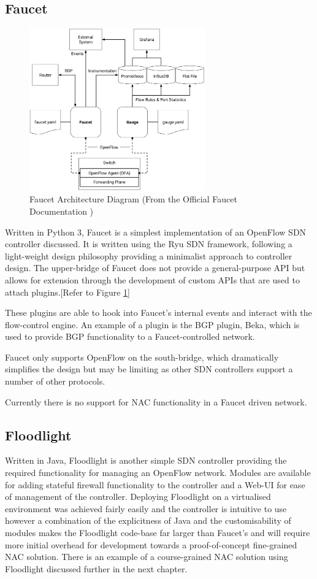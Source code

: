 \subsection{Faucet}
\begin{figure}\begin{center}
    \includegraphics[height=7cm]{images/faucet_architecture.png}
    \caption{Faucet Architecture Diagram (From the Official Faucet Documentation \cite{faucet_architecture_diagram})}
    \label{fig:faucet_architecture}
\end{center}\end{figure}
Written in Python 3, Faucet is a simplest implementation of an OpenFlow SDN controller discussed. It is written using the Ryu SDN framework, following a light-weight design philosophy providing a minimalist approach to controller design.
The upper-bridge of Faucet does not provide a general-purpose API but allows for extension through the development of custom APIs that are used to attach plugins.[Refer to Figure \ref{fig:faucet_architecture}]

These plugins are able to hook into Faucet's internal events and interact with the flow-control engine. An example of a plugin is the BGP plugin, Beka\cite{beka_github}, which is used to provide BGP functionality to a Faucet-controlled network.

Faucet only supports OpenFlow on the south-bridge, which dramatically simplifies the design but may be limiting as other SDN controllers support a number of other protocols.

Currently there is no support for NAC functionality in a Faucet driven network.

\subsection{Floodlight}
Written in Java, Floodlight is another simple SDN controller providing the required functionality for managing an OpenFlow network. 
Modules are available for adding stateful firewall functionality to the controller and a Web-UI for ease of management of the controller.
Deploying Floodlight on a virtualised environment was achieved fairly easily and the controller is intuitive to use however a combination of the explicitness of Java and the customisability of modules makes the Floodlight code-base far larger than Faucet's and will require more initial overhead for development towards a proof-of-concept fine-grained NAC solution.
There is an example of a course-grained NAC solution using Floodlight\cite{vainius_sdn_nac} discussed further in the next chapter.

